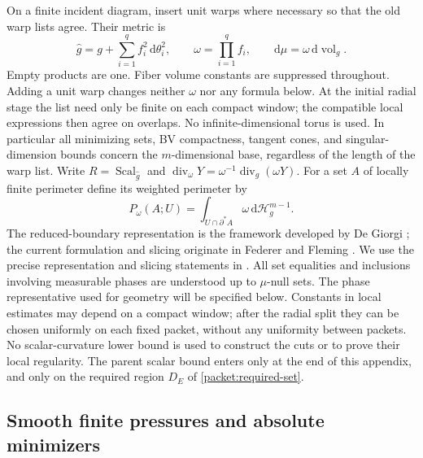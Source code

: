 \documentclass[11pt]{article}
\numberwithin{equation}{section}
\theoremstyle{definition}
\theoremstyle{remark}
\begin{document}
On a finite incident diagram, insert unit warps where necessary so that
the old warp lists agree.  Their metric is
\[
 \widehat g=g+\sum_{i=1}^q f_i^2\,\mathrm d\theta_i^2,
 \qquad \omega=\prod_{i=1}^q f_i,
 \qquad \mathrm d\mu=\omega\,\mathrm d\operatorname{vol}_g.
\]
Empty products are one.  Fiber volume constants are suppressed throughout.
Adding a unit warp changes neither $\omega$ nor any formula below.
At the initial radial stage the list need only be finite on each compact
window; the compatible local expressions then agree on overlaps.  No
infinite-dimensional torus is used.  In particular all minimizing sets,
BV compactness, tangent cones, and singular-dimension bounds concern the
$m$-dimensional base, regardless of the length of the warp list.
Write $R=\operatorname{Scal}_{\widehat g}$ and
$\operatorname{div}_\omega Y=\omega^{-1}\operatorname{div}_g(\omega Y)$.
For a set $A$ of locally finite perimeter define its weighted perimeter by
\[
 P_\omega(A;U)=\int_{U\cap\partial^*A}\omega\,\mathrm d\mathcal H_g^{m-1}.
\]
The reduced-boundary representation is the framework developed by
De Giorgi \citep{deGiorgi1954,deGiorgi1955}; the current formulation
and slicing originate in Federer and Fleming \citep{federerFleming1960}.
We use the precise representation and slicing statements in
\citet[Chapter~3, Section~4, and Chapter~6, Section~4]{simonGMT}.
All set equalities and inclusions involving measurable phases are understood
up to $\mu$-null sets.  The phase representative used for geometry will be
specified below.  Constants in local estimates may depend on a compact
window; after the radial split they can be chosen uniformly on each fixed
packet, without any uniformity between packets.  No scalar-curvature lower bound
is used to construct the cuts or to prove their local regularity.  The
parent scalar bound enters only at the end of this appendix, and only on
the required region $D_E$ of \cref{packet:required-set}.

\subsection{Smooth finite pressures and absolute minimizers}
\end{document}
